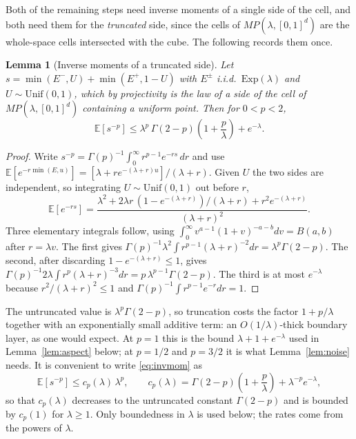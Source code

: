 \documentclass[12pt,a4paper]{article}
\numberwithin{equation}{section}
\theoremstyle{plain}
\newtheorem{lemma}{Lemma}
\theoremstyle{definition}
\newcommand{\E}{\mathbb{E}}
\begin{document}
	Both of the remaining steps need inverse moments of a single side of the
	cell, and both need them for the \emph{truncated} side, since the cells of
	$MP(\lambda,[0,1]^d)$ are the whole-space cells intersected with the cube.
	The following records them once.

	\begin{lemma}[Inverse moments of a truncated side]
		\label{lem:invmom}
		Let $s = \min(E^-, U) + \min(E^+, 1-U)$ with $E^\pm$ i.i.d.\
		$\mathrm{Exp}(\lambda)$ and $U \sim \mathrm{Unif}(0,1)$, which by
		projectivity is the law of a side of the cell of $MP(\lambda,[0,1]^d)$
		containing a uniform point. Then for $0 < p < 2$,
		\begin{equation}
			\E\!\left[s^{-p}\right]
			\leq \lambda^p\,\Gamma(2-p)\left(1 + \frac{p}{\lambda}\right)
			+ e^{-\lambda} .
			\label{eq:invmom}
		\end{equation}
	\end{lemma}

	\begin{proof}
		Write $s^{-p} = \Gamma(p)^{-1}\int_0^\infty r^{p-1}e^{-rs}\,dr$ and use
		$\E[e^{-r\min(E,u)}] = [\lambda + re^{-(\lambda+r)u}]/(\lambda+r)$. Given
		$U$ the two sides are independent, so integrating $U \sim \mathrm{Unif}(0,1)$
		out before $r$,
		\begin{equation}
			\E\!\left[e^{-rs}\right]
			= \frac{\lambda^2
			+ 2\lambda r\,(1-e^{-(\lambda+r)})/(\lambda+r)
			+ r^2 e^{-(\lambda+r)}}{(\lambda+r)^2} .
		\end{equation}
		Three elementary integrals follow, using
		$\int_0^\infty v^{a-1}(1+v)^{-a-b}dv = B(a,b)$ after $r = \lambda v$.
		The first gives
		$\Gamma(p)^{-1}\lambda^2\int r^{p-1}(\lambda+r)^{-2}dr
		= \lambda^p\Gamma(2-p)$. The second, after discarding
		$1-e^{-(\lambda+r)} \leq 1$, gives
		$\Gamma(p)^{-1} 2\lambda\int r^{p}(\lambda+r)^{-3}dr
		= p\,\lambda^{p-1}\Gamma(2-p)$. The third is at most $e^{-\lambda}$
		because $r^2/(\lambda+r)^2 \leq 1$ and
		$\Gamma(p)^{-1}\int r^{p-1}e^{-r}dr = 1$.
	\end{proof}

	The untruncated value is $\lambda^p\Gamma(2-p)$, so truncation costs the
	factor $1 + p/\lambda$ together with an exponentially small additive term:
	an $O(1/\lambda)$-thick boundary layer, as one would expect. At $p=1$ this
	is the bound $\lambda + 1 + e^{-\lambda}$ used in Lemma~\ref{lem:aspect}
	below; at $p = 1/2$ and $p = 3/2$ it is what Lemma~\ref{lem:noise} needs. It
	is convenient to write \eqref{eq:invmom} as
	\begin{equation}
		\E\!\left[s^{-p}\right] \leq c_p(\lambda)\,\lambda^p,
		\qquad
		c_p(\lambda) = \Gamma(2-p)\left(1 + \frac{p}{\lambda}\right)
		+ \lambda^{-p}e^{-\lambda},
		\label{eq:cp}
	\end{equation}
	so that $c_p(\lambda)$ decreases to the untruncated constant $\Gamma(2-p)$
	and is bounded by $c_p(1)$ for $\lambda \geq 1$. Only boundedness in
	$\lambda$ is used below; the rates come from the powers of $\lambda$.
\end{document}
